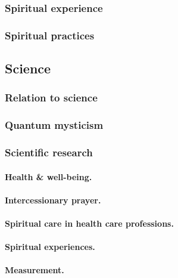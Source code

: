 \documentclass[oneside]{book}
\numberwithin{equation}{section}
\begin{document}
\subsubsection{Spiritual experience}

\subsubsection{Spiritual practices}

\subsection{Science}

\subsubsection{Relation to science}

\subsubsection{Quantum mysticism}

\subsubsection{Scientific research}

\paragraph{Health \& well-being.}

\paragraph{Intercessionary prayer.}

\paragraph{Spiritual care in health care professions.}

\paragraph{Spiritual experiences.}

\paragraph{Measurement.}

\end{document}
